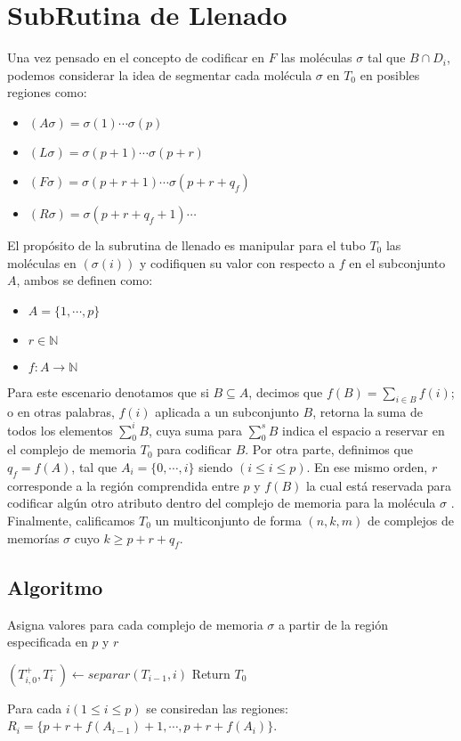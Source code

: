 \documentclass[12pt, letterpaper, twoside]{article}
\begin{document}
    \section{SubRutina de Llenado}
    Una vez pensado en el concepto de codificar en $F$ las moléculas $\sigma$ tal que $B\cap D_i$, podemos considerar la idea de segmentar cada molécula $\sigma$ en $T_0$ en posibles regiones como:
    \begin{itemize}
        \item $(A\sigma )=\sigma (1)\cdots\sigma (p)$
        \item $(L\sigma )=\sigma (p+1)\cdots\sigma (p+r)$
        \item $(F\sigma)=\sigma(p+r+1)\cdots\sigma(p+r+q_f)$
        \item $(R\sigma)=\sigma(p+r+q_f+1)\cdots$
    \end{itemize} 
   El propósito de la subrutina de llenado es manipular para el tubo $T_0$ las moléculas en $(\sigma(i))$ y codifiquen su valor con respecto a $f$ en el subconjunto $A$, ambos se definen como:
   \begin{itemize}
       \item $A=\{1,\cdots,p\}$
       \item $r \in \mathbb{N}$
       \item $f:A\rightarrow\mathbb{N}$
   \end{itemize}
   Para este escenario denotamos que si $B\subseteq A$, decimos que  $f(B)=\sum_{i\in B}f(i)$; o en otras palabras, $f(i)$ aplicada a un subconjunto $B$, retorna la suma de todos los elementos $\sum_{0}^{i}B$, cuya suma para $\sum_{0}^{s}B$ indica el espacio a reservar en el complejo de memoria $T_0$ para codificar $B$. Por otra parte, definimos que $q_f=f(A)$, tal que $A_i=\{0,\cdots,i\}$ siendo $(i\leq i\leq p)$. En ese mismo orden, $r$ corresponde a la región comprendida entre $p$ y $f(B)$ la cual está reservada para codificar algún otro atributo dentro del complejo de memoria para la molécula $\sigma$ . Finalmente, calificamos $T_0$ un multiconjunto de forma $(n,k,m)$ de complejos de memorías $\sigma$ cuyo $k\geq p+r+q_f$.
   \subsection{Algoritmo}
    \begin{algorithm}
        \caption{Asigna valores para cada complejo de memoria $\sigma$ a partir de la región especificada en $p$ y $r$}
        \label{ParallelFill}
        \begin{algorithmic}[1]
                \State $(T^+_{i,0}, T^-_i) \leftarrow separar(T_{i-1}, i)$
                \EndFor
            \EndFor
            \State Return $T_0$
            \EndProcedure
        \end{algorithmic}
    \end{algorithm}
    Para cada $i (1\leq i \leq p)$ se consiredan las regiones:\\ $R_i=\{p+r+f(A_{i-1})+1,\cdots,p+r+f(A_i)\}$.
\end{document}
